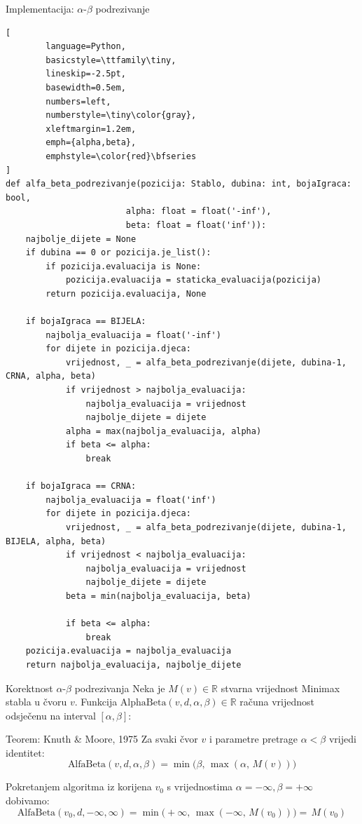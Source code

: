 \documentclass[aspectratio=43]{beamer}
\begin{document}
\begin{frame}[t, fragile]{Implementacija: $\alpha$-$\beta$ podrezivanje}
	\begin{lstlisting}[
    	language=Python,
    	basicstyle=\ttfamily\tiny,
    	lineskip=-2.5pt,
    	basewidth=0.5em,
    	numbers=left,
    	numberstyle=\tiny\color{gray},
    	xleftmargin=1.2em,
    	emph={alpha,beta},
    	emphstyle=\color{red}\bfseries
]
def alfa_beta_podrezivanje(pozicija: Stablo, dubina: int, bojaIgraca: bool, 
                        alpha: float = float('-inf'), 
                        beta: float = float('inf')):
    najbolje_dijete = None
    if dubina == 0 or pozicija.je_list():
        if pozicija.evaluacija is None:
            pozicija.evaluacija = staticka_evaluacija(pozicija)
        return pozicija.evaluacija, None

    if bojaIgraca == BIJELA:
        najbolja_evaluacija = float('-inf')
        for dijete in pozicija.djeca:
            vrijednost, _ = alfa_beta_podrezivanje(dijete, dubina-1, CRNA, alpha, beta)
            if vrijednost > najbolja_evaluacija:
                najbolja_evaluacija = vrijednost
                najbolje_dijete = dijete
            alpha = max(najbolja_evaluacija, alpha)
            if beta <= alpha:
                break

    if bojaIgraca == CRNA:
        najbolja_evaluacija = float('inf')
        for dijete in pozicija.djeca:
            vrijednost, _ = alfa_beta_podrezivanje(dijete, dubina-1, BIJELA, alpha, beta)
            if vrijednost < najbolja_evaluacija:
                najbolja_evaluacija = vrijednost
                najbolje_dijete = dijete
            beta = min(najbolja_evaluacija, beta)

            if beta <= alpha:
                break
    pozicija.evaluacija = najbolja_evaluacija   
    return najbolja_evaluacija, najbolje_dijete
	\end{lstlisting}
\end{frame}


\begin{frame}{Korektnost $\alpha$-$\beta$ podrezivanja}
	Neka je $M(v) \in \mathbb{R}$ stvarna vrijednost Minimax stabla u čvoru $v$. Funkcija $\text{AlphaBeta}(v, d, \alpha, \beta) \in \mathbb{R}$ računa vrijednost odsječenu na interval $[\alpha, \beta]$:
	
	\begin{block}{Teorem: Knuth \& Moore, 1975}
		Za svaki čvor $v$ i parametre pretrage $\alpha < \beta$ vrijedi identitet:
		\[
		\text{AlfaBeta}(v, d, \alpha, \beta) = \min\big(\beta, \, \max(\alpha, \, M(v))\big)
		\]
	\end{block}
	
	\pause
	\vspace{0.2cm}
	Pokretanjem algoritma iz korijena $v_0$ s vrijednostima $\alpha = -\infty, \beta = +\infty$ dobivamo:
	\[
		\text{AlfaBeta}(v_0, d, -\infty, \infty) = \min\big(+\infty, \, \max(-\infty, \, M(v_0))\big) = \,M(v_0)
		\]
	
	\pause
	\vspace{0.2cm}
\end{frame}
\end{document}
